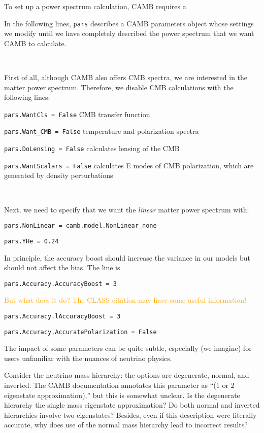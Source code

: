
To set up a power spectrum calculation, CAMB requires a 

In the following lines, \verb|pars| describes a CAMB parameters object whose
settings we modify until we have completely described the power spectrum that
we want CAMB to calculate.

\

First of all, although CAMB also offers CMB spectra, we are interested in the
matter power spectrum. Therefore, we disable CMB calculations with the 
following lines:

\verb|pars.WantCls = False| \quad CMB transfer function

\verb|pars.Want_CMB = False| \quad temperature and polarization spectra

\verb|pars.DoLensing = False| \quad calculates lensing of the CMB

\verb|pars.WantScalars = False| \quad calculates E modes of CMB polarization, 
which are generated by density perturbations 

\

Next, we need to specify that we want the \textit{linear} matter power 
spectrum with:

\verb|pars.NonLinear = camb.model.NonLinear_none|



\verb|pars.YHe = 0.24|

In principle, the accuracy boost should increase the variance in our models but should not affect the bias. The line is

\verb|pars.Accuracy.AccuracyBoost = 3|

\textcolor{orange}{But what does it do? The CLASS citation may have some
useful information!}

\verb|pars.Accuracy.lAccuracyBoost = 3|

\verb|pars.Accuracy.AccuratePolarization = False|


The impact of some parameters can be quite subtle, especially (we imagine)
for users unfamiliar with the nuances of neutrino physics.

Consider the neutrino mass 
hierarchy: the options are degenerate, normal, and inverted. The CAMB 
documentation annotates this parameter as ``(1 or 2 eigenstate 
approximation),'' but this is somewhat unclear. Is the degenerate hierarchy 
the single mass eigenstate approximation? Do both normal and inverted 
hierarchies involve two eigenstates? Besides, even if this description were
literally accurate, why does use of the normal mass hierarchy lead to
incorrect results?

